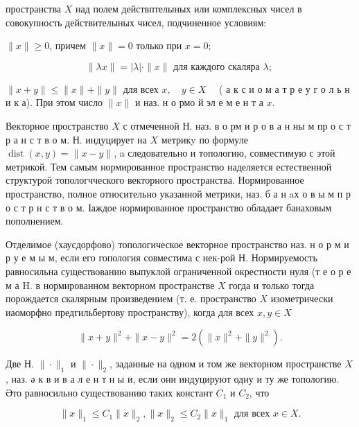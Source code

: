 \documentclass[10pt]{article}
\begin{document}
пространства $X$ над полем действптелыных или комплексных чисел в совокупность действителыных чисел, подчиненное условиям:



$\|x\| \geqslant 0$, причем $\|x\|=0$ только при $x=0$;



\[

\|\lambda x\|=|\lambda| \cdot\|x\| \text { для каждого скаляра } \lambda \text {; }

\]



$\|x+y\| \leqslant\|x\|+\|y\|$ для всех $x, \quad y \in X \quad$ ( а к с и о м а т р е у г о л ь н и к а). При этом число $\|x\|$ и наз. н о рмо й эл е м е н т а $x$.



Векторное пространство $X$ с отмеченной Н. наз. в о рм и р о в а н ны м пр о с т р а н с т в о м. Н. индуцирует на $X$ метрикy по формуле $\operatorname{dist}(x, y)=\|x-y\|$, a следовательно и топологию, совместимую с этой метрикой. Тем самым нормированное пространство наделяется естественной структурой топологчческого векторного пространства. Нормированное пространство, полное относительно указанной метрики, наз. б а н aх о в ы м п р о с т р н с т в о м. Іаждое нормированное пространство обладает банаховым пополнением.



Отделимое (хаусдорфово) топологическое векторное пространство наз. н о р м и р у е м ы м, если его гопология совместима с нек-рой Н. Нормируемость равносильна существованию выпуклой ограниченной окрестности нуля (т е о р е м а H. в нормированном векторном пространстве $X$ гогда и только тогда порождается скалярным произведением (т. е. пространство $X$ изометрически иаоморфно предгильбертову пространству), когда для всех $x, y \in X$



\[

\|x+y\|^{2}+\|x-y\|^{2}=2\left(\|x\|^{2}+\|y\|^{2}\right) .

\]



Две Н. $\|\cdot\|_{1}$ и $\|\cdot\|_{2}$, заданные на одном и том же векторном пространстве $X$, наз. ә к в и в а л е н т н ы и, если они индуцируют одну и ту же топологию. Әто равносильно существованию таких констант $C_{1}$ и $C_{2}$, что



\[

\|x\|_{1} \leqslant C_{1}\|x\|_{2},\|x\|_{2} \leqslant C_{2}\|x\|_{1} \text { для всех } x \in X .

\]
\end{document}
